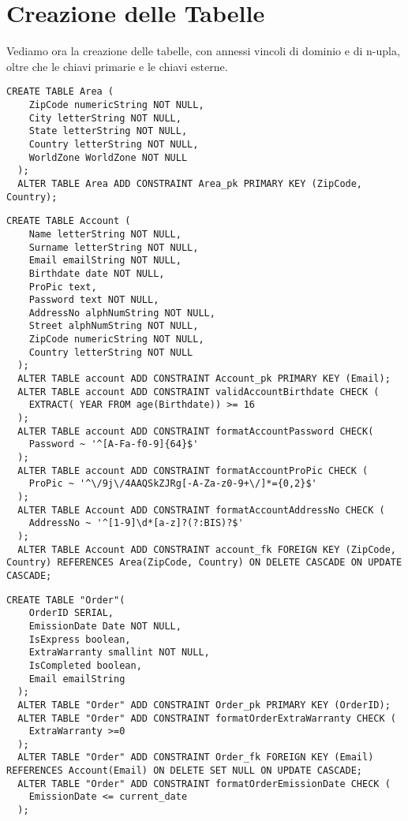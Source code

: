 \section{Creazione delle Tabelle}

Vediamo ora la creazione delle tabelle, con annessi vincoli di dominio e di n-upla, oltre che le chiavi primarie e le chiavi esterne.

\begin{lstlisting}[caption={Creazione della tabella \textbf{Area}}]
  CREATE TABLE Area (
    ZipCode numericString NOT NULL,
    City letterString NOT NULL,
    State letterString NOT NULL,
    Country letterString NOT NULL,
    WorldZone WorldZone NOT NULL
  );
  ALTER TABLE Area ADD CONSTRAINT Area_pk PRIMARY KEY (ZipCode, Country);
\end{lstlisting}

\begin{lstlisting}[caption={Creazione della tabella \textbf{Account}}]
  CREATE TABLE Account (
    Name letterString NOT NULL,
    Surname letterString NOT NULL,
    Email emailString NOT NULL,
    Birthdate date NOT NULL,
    ProPic text,
    Password text NOT NULL,
    AddressNo alphNumString NOT NULL,
    Street alphNumString NOT NULL,
    ZipCode numericString NOT NULL,
    Country letterString NOT NULL
  );
  ALTER TABLE account ADD CONSTRAINT Account_pk PRIMARY KEY (Email);
  ALTER TABLE account ADD CONSTRAINT validAccountBirthdate CHECK (
    EXTRACT( YEAR FROM age(Birthdate)) >= 16 
  );
  ALTER TABLE account ADD CONSTRAINT formatAccountPassword CHECK(
    Password ~ '^[A-Fa-f0-9]{64}$'
  );
  ALTER TABLE account ADD CONSTRAINT formatAccountProPic CHECK (
    ProPic ~ '^\/9j\/4AAQSkZJRg[-A-Za-z0-9+\/]*={0,2}$'
  );
  ALTER TABLE Account ADD CONSTRAINT formatAccountAddressNo CHECK (
    AddressNo ~ '^[1-9]\d*[a-z]?(?:BIS)?$'
  );
  ALTER TABLE Account ADD CONSTRAINT account_fk FOREIGN KEY (ZipCode, Country) REFERENCES Area(ZipCode, Country) ON DELETE CASCADE ON UPDATE CASCADE;
\end{lstlisting}

\newpage
\begin{lstlisting}[caption={Creazione della tabella \textbf{Order}}]
  CREATE TABLE "Order"(
    OrderID SERIAL, 
    EmissionDate Date NOT NULL,
    IsExpress boolean,
    ExtraWarranty smallint NOT NULL,
    IsCompleted boolean,
    Email emailString
  );
  ALTER TABLE "Order" ADD CONSTRAINT Order_pk PRIMARY KEY (OrderID);
  ALTER TABLE "Order" ADD CONSTRAINT formatOrderExtraWarranty CHECK (
    ExtraWarranty >=0
  );
  ALTER TABLE "Order" ADD CONSTRAINT Order_fk FOREIGN KEY (Email) REFERENCES Account(Email) ON DELETE SET NULL ON UPDATE CASCADE;
  ALTER TABLE "Order" ADD CONSTRAINT formatOrderEmissionDate CHECK (
    EmissionDate <= current_date
  );
\end{lstlisting}

